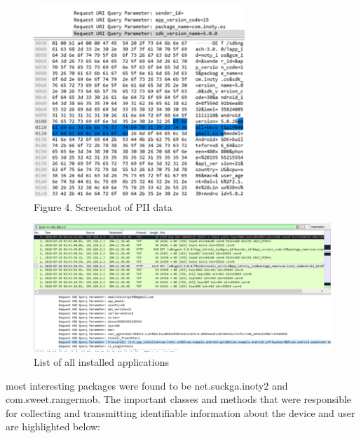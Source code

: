 \documentclass[conference]{IEEEtran}
\begin{document}
\begin{figure}
    \centering
    \includegraphics{fig4.png}
    \caption{Figure 4. Screenshot of PII data}
    \label{fig:my_label}
\end{figure}
\begin{figure}
    \centering
    \includegraphics{fig5.png}
    \caption{List of all installed applications}
    \label{fig:my_label}
\end{figure}
\twocolumn
most interesting packages were found to be net.suckga.inoty2 and com.sweet.rangermob. The important classes and methods that were responsible for collecting and transmitting identifiable information about the device and user are highlighted below:
\end{document}
